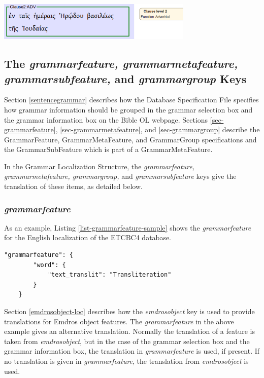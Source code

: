 \documentclass[11pt,oneside,a4paper]{memoir}
\begin{document}
\begin{center}
  \parbox{0.7\textwidth}{
    \includegraphics[width=0.7\textwidth]{clause2.png}
    \label{fig-clause2}
  }
\end{center}


\subsection{The \emph{grammarfeature, grammarmetafeature, grammarsubfeature,} and \emph{grammargroup} Keys}%
\label{grammar-loc}

Section \ref{sentencegrammar} describes how the Database Specification File specifies how grammar
information should be grouped in the grammar selection box and the grammar information box on the
Bible OL webpage. Sections \ref{sec-grammarfeature}, \ref{sec-grammarmetafeature}, and
\ref{sec-grammargroup} describe the GrammarFeature, GrammarMetaFeature, and GrammarGroup
specifications and the GrammarSubFeature which is part of a GrammarMetaFeature.

In the Grammar Localization Structure, the \emph{grammarfeature, grammarmetafeature, grammargroup,} and
\emph{grammarsubfeature} keys give the translation of these items, as detailed below.

\subsubsection{\emph{grammarfeature}}

As an example, Listing \ref{list-grammarfeature-sample} shows the \emph{grammarfeature} for the
English localization of the ETCBC4 database.

\begin{lstlisting}[caption=A sample grammarfeature value,label=list-grammarfeature-sample]
    "grammarfeature": {
        "word": {
            "text_translit": "Transliteration"
        }
    }
\end{lstlisting}

Section \ref{emdrosobject-loc} describes how the \emph{emdrosobject} key is used
to provide translations for Emdros object features. The \emph{grammarfeature} in the above example
gives an alternative translation. Normally the translation of a feature is taken from
\emph{emdrosobject}, but in the case of the grammar selection box and
the grammar information box, the translation in \emph{grammarfeature}
is used, if present. If no translation is given in \emph{grammarfeature}, the translation from
\emph{emdrosobject} is used.
\end{document}
